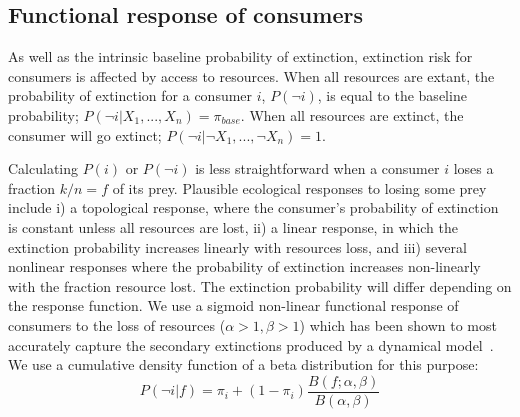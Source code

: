 \documentclass[12pt]{article}
\begin{document}
\begin{spacing}{2.0}

    

\section{Functional response of consumers}
        As well as the intrinsic baseline probability of extinction, extinction risk for consumers is affected by access to resources. 
		When all resources are extant, the probability of extinction for a consumer $i$, $P(\lnot i)$, is equal to the baseline probability; $P(\lnot i|X_{1},...,X_{n}) = \pi_{base}$. 
		When all resources are extinct, the consumer will go extinct; $P(\lnot i|\lnot X_{1},...,\lnot X_{n})=1$. 

		Calculating $P(i)$ or $P(\lnot i)$ is less straightforward when a consumer $i$ loses a fraction $k/n = f$ of its prey. 
		Plausible ecological responses to losing some prey include i) a topological response, where the consumer's probability of extinction is constant unless all resources are lost, ii) a linear response, in which the extinction probability increases linearly with resources loss, and iii) several nonlinear responses where the probability of extinction increases non-linearly with the fraction resource lost. 
		The extinction probability will differ depending on the response function. 
		We use a sigmoid non-linear functional response of consumers to the loss of resources ($\alpha >1, \beta >1$) which has been shown to most accurately capture the secondary extinctions produced by a dynamical model~\citep{Eklof2013}. 
		We use a cumulative density function of a beta distribution for this purpose:
		\begin{equation}
		\label{betafunc}
		P(\lnot i|f) = \pi_{i} + (1 - \pi_{i}) \frac{B(f;\alpha,\beta)}{B(\alpha,\beta)}
		\end{equation}




\end{spacing}
\end{document}
